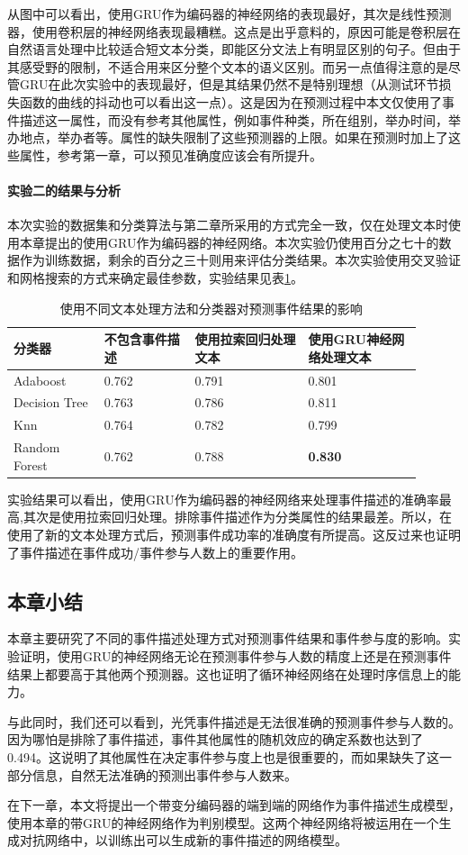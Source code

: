 从图中可以看出，使用GRU作为编码器的神经网络的表现最好，其次是线性预测器，使用卷积层的神经网络表现最糟糕。这点是出乎意料的，原因可能是卷积层在自然语言处理中比较适合短文本分类，即能区分文法上有明显区别的句子。但由于其感受野的限制，不适合用来区分整个文本的语义区别。而另一点值得注意的是尽管GRU在此次实验中的表现最好，但是其结果仍然不是特别理想（从测试环节损失函数的曲线的抖动也可以看出这一点）。这是因为在预测过程中本文仅使用了事件描述这一属性，而没有参考其他属性，例如事件种类，所在组别，举办时间，举办地点，举办者等。属性的缺失限制了这些预测器的上限。如果在预测时加上了这些属性，参考第一章，可以预见准确度应该会有所提升。 
\paragraph{实验二的结果与分析}\label{train_discrimiator}
本次实验的数据集和分类算法与第二章所采用的方式完全一致，仅在处理文本时使用本章提出的使用GRU作为编码器的神经网络。本次实验仍使用百分之七十的数据作为训练数据，剩余的百分之三十则用来评估分类结果。本次实验使用交叉验证和网格搜索的方式来确定最佳参数，实验结果见表\ref{t2-2}。

\begin{table}[htb] 
    \centering
    \caption{\label{t2-2}使用不同文本处理方法和分类器对预测事件结果的影响}
    \begin{tabular*}{\linewidth}{p{0.2\linewidth}p{0.2\linewidth}p{0.25\linewidth}p{0.25\linewidth}}
\toprule 
分类器&不包含事件描述&使用拉索回归处理文本&使用GRU神经网络处理文本\\
\midrule
Adaboost & 0.762 & 0.791 & 0.801 \\
Decision Tree& 0.763 & 0.786 & 0.811\\
Knn & 0.764 & 0.782 & 0.799 \\
Random Forest & 0.762 & 0.788 & \textbf{0.830} \\
\bottomrule
    \end{tabular*}
\end{table}

实验结果可以看出，使用$\mathrm{GRU}$作为编码器的神经网络来处理事件描述的准确率最高,其次是使用拉索回归处理。排除事件描述作为分类属性的结果最差。所以，在使用了新的文本处理方式后，预测事件成功率的准确度有所提高。这反过来也证明了事件描述在事件成功/事件参与人数上的重要作用。
\subsection{本章小结}
本章主要研究了不同的事件描述处理方式对预测事件结果和事件参与度的影响。实验证明，使用GRU的神经网络无论在预测事件参与人数的精度上还是在预测事件结果上都要高于其他两个预测器。这也证明了循环神经网络在处理时序信息上的能力。

与此同时，我们还可以看到，光凭事件描述是无法很准确的预测事件参与人数的。因为哪怕是排除了事件描述，事件其他属性的随机效应的确定系数也达到了0.494。这说明了其他属性在决定事件参与度上也是很重要的，而如果缺失了这一部分信息，自然无法准确的预测出事件参与人数来。

在下一章，本文将提出一个带变分编码器的端到端的网络作为事件描述生成模型，使用本章的带GRU的神经网络作为判别模型。这两个神经网络将被运用在一个生成对抗网络中，以训练出可以生成新的事件描述的网络模型。
%  